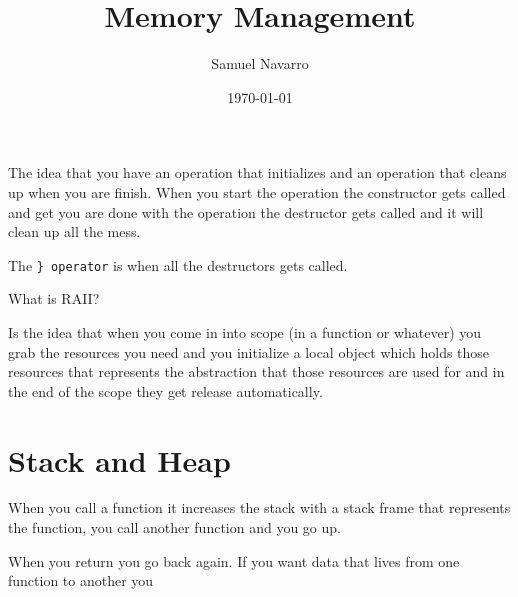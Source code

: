 \documentclass[11pt, a4paper]{article}
\begin{document}
\title{Memory Management}
\author{Samuel Navarro}
\date{\today}
\maketitle

\tableofcontents{}



The idea that you have an operation that initializes and an operation that cleans up when you are finish. When you start the operation the constructor gets called and get you are done with the operation the destructor gets called and it will clean up all the mess. 

The \texttt{\} operator} is when all the destructors gets called.


What is RAII?

Is the idea that when you come in into scope (in a function or whatever) you grab the resources you need and you initialize a local object which holds those resources that represents the abstraction that those resources are used for and in the end of the scope they get release automatically. 



\section{Stack and Heap}%
\label{sec:stack_and_heap}

When you call a function it increases the stack with a stack frame that represents the function, you call another function and you go up. 

When you return you go back again. If you want data that lives from one function to another you



	
\end{document}
